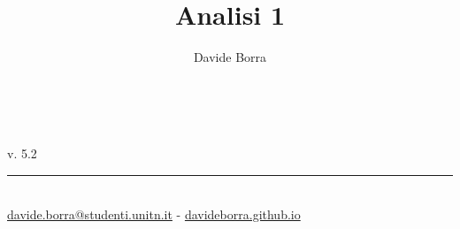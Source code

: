 \documentclass{book}     %
\title{Analisi 1}
\author{Davide Borra}
\date{}
\makeatletter
\let\runauthor\@author
\let\runtitle\@title
\makeatother
\begin{document}
\lhead{}
\chead{}
\rfoot{\runauthor}

\begin{titlepage}
    \pagestyle{empty}
    \begin{center}
        \vspace*{\fill}
        \vspace{0.5cm}
        \textbf{\Huge \runtitle}\\\vspace{5mm}
        \textsc{\Large \runauthor}
        \vspace{5cm}
    \end{center}
    \vspace*{\fill}
    v. 5.2\\
    \rule{0.8\linewidth}{0.5mm}\\
    {\footnotesize\href{mailto:davide.borra@studenti.unitn.it}{davide.borra@studenti.unitn.it} - \href{http://davideborra.github.io}{davideborra.github.io}}
    \restoregeometry
\end{titlepage}
\thispagestyle{empty}
\frontmatter
    \tableofcontents
    \creativecommons
\mainmatter
\lhead{\runtitle}
\chead{}
\rhead{\leftmark\ - \rightmark}
\rfoot{\runauthor}








\end{document}
